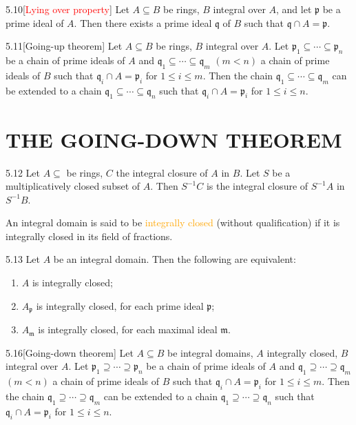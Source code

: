 \begin{theorem}{5.10}[\textcolor{red}{Lying over property}]
	Let $A\subseteq B$ be rings, $B$ integral over $A$, and let $\mathfrak{p}$ be a prime ideal of $A$. Then there exists a prime ideal $\mathfrak{q}$ of $B$ such that $\mathfrak{q}\cap A=\mathfrak{p}$.
\end{theorem}

\begin{theorem}{5.11}[Going-up theorem]
	Let $A\subseteq B$ be rings, $B$ integral over $A$. Let $\mathfrak{p}_1\subseteq\cdots\subseteq\mathfrak{p}_n$ be a chain of prime ideals of $A$ and $\mathfrak{q}_1\subseteq\cdots\subseteq\mathfrak{q}_m$ $(m<n)$ a chain of prime ideals of $B$ such that $\mathfrak{q}_i\cap A=\mathfrak{p}_i$ for $1\leqslant i\leqslant m$. Then the chain $\mathfrak{q}_1\subseteq\cdots\subseteq\mathfrak{q}_m$ can be extended to a chain $\mathfrak{q}_1\subseteq\cdots\subseteq\mathfrak{q}_n$ such that $\mathfrak{q}_i\cap A=\mathfrak{p}_i$ for $1\leqslant i\leqslant n$.
\end{theorem}

\section*{THE GOING-DOWN THEOREM}

\begin{proposition}{5.12}
	Let $A\subseteq$ be rings, $C$ the integral closure of $A$ in $B$. Let $S$ be a multiplicatively closed subset of $A$. Then $S^{-1}C$ is the integral closure of $S^{-1}A$ in $S^{-1}B$.
\end{proposition}

An integral domain is said to be \textcolor{orange}{integrally closed} (without qualification) if it is integrally closed in its field of fractions.
	
\begin{proposition}{5.13}
	Let $A$ be an integral domain. Then the following are equivalent:
	\begin{enumerate}[label=\textup{(\roman*)}]
		\item $A$ is integrally closed;
		\item $A_\mathfrak{p}$ is integrally closed, for each prime ideal $\mathfrak{p}$;
		\item $A_\mathfrak{m}$ is integrally closed, for each maximal ideal $\mathfrak{m}$.
	\end{enumerate}
\end{proposition}

\begin{theorem}{5.16}[Going-down theorem]
	Let $A\subseteq B$ be integral domains, $A$ integrally closed, $B$ integral over $A$. Let $\mathfrak{p}_1\supseteq\cdots\supseteq\mathfrak{p}_n$ be a chain of prime ideals of $A$ and $\mathfrak{q}_1\supseteq\cdots\supseteq\mathfrak{q}_m$ $(m<n)$ a chain of prime ideals of $B$ such that $\mathfrak{q}_i\cap A=\mathfrak{p}_i$ for $1\leqslant i\leqslant m$. Then the chain $\mathfrak{q}_1\supseteq\cdots\supseteq\mathfrak{q}_m$ can be extended to a chain $\mathfrak{q}_1\supseteq\cdots\supseteq\mathfrak{q}_n$ such that $\mathfrak{q}_i\cap A=\mathfrak{p}_i$ for $1\leqslant i\leqslant n$.
\end{theorem}

